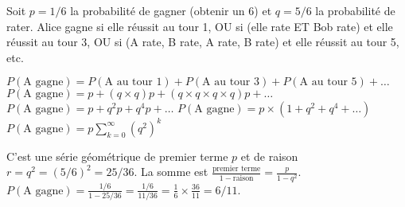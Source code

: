 \begin{correctionbox}
Soit $p=1/6$ la probabilité de gagner (obtenir un 6) et $q=5/6$ la probabilité de rater.
Alice gagne si elle réussit au tour 1, OU si (elle rate ET Bob rate) et elle réussit au tour 3, OU si (A rate, B rate, A rate, B rate) et elle réussit au tour 5, etc.

$P(\text{A gagne}) = P(\text{A au tour 1}) + P(\text{A au tour 3}) + P(\text{A au tour 5}) + \dots$
$P(\text{A gagne}) = p + (q \times q)p + (q \times q \times q \times q)p + \dots$
$P(\text{A gagne}) = p + q^2 p + q^4 p + \dots$
$P(\text{A gagne}) = p \times (1 + q^2 + q^4 + \dots)$
$P(\text{A gagne}) = p \sum_{k=0}^{\infty} (q^2)^k$

C'est une série géométrique de premier terme $p$ et de raison $r = q^2 = (5/6)^2 = 25/36$.
La somme est $\frac{\text{premier terme}}{1 - \text{raison}} = \frac{p}{1 - q^2}$.
$P(\text{A gagne}) = \frac{1/6}{1 - 25/36} = \frac{1/6}{11/36} = \frac{1}{6} \times \frac{36}{11} = 6/11$.
\end{correctionbox}